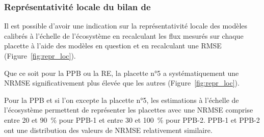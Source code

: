 %
%
%


\subsubsection{Représentativité locale du bilan de \coo}

Il est possible d'avoir une indication sur la représentativité locale des modèles calibrés à l'échelle de l'écosystème en recalculant les flux mesurés sur chaque placette à l'aide des modèles en question et en recalculant une RMSE (Figure~\ref{fig:repr_loc}).

Que ce soit pour la PPB ou la RE, la placette n°5 a systématiquement une NRMSE significativement plus élevée que les autres (Figure~\ref{fig:repr_loc}).

Pour la PPB et si l'on excepte la placette n°5, les estimations à l'échelle de l'écosystème permettent de représenter les placettes avec une NRMSE comprise entre 20 et \SI{90}{\percent} pour PPB-1 et entre 30 et \SI{100}{\percent} pour PPB-2.
PPB-1 et PPB-2 ont une distribution des valeurs de NRMSE relativement similaire.

